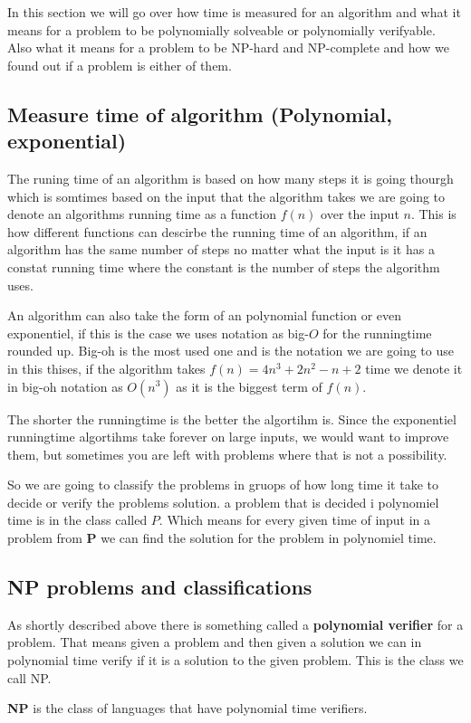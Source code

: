 In this section we will go over how time is measured for an algorithm and what it means for a problem to be polynomially solveable or polynomially verifyable. 
Also what it means for a problem to be NP-hard and NP-complete and how we found out if a problem is either of them. 

\subsection{Measure time of algorithm (Polynomial, exponential)}
The runing time of an algorithm is based on how many steps it is going thourgh which is somtimes based on the input that the algorithm takes we are going to denote an algorithms running time as a function $f(n)$ over the input $n$. 
This is how different functions can descirbe the running time of an algorithm, if an algorithm has the same number of steps no matter what the input is it has a constat running time where the constant is the number of steps the algorithm uses. 

An algorithm can also take the form of an polynomial function or even exponentiel, if this is the case we uses notation as big-$O$ for the runningtime rounded up. 
Big-oh is the most used one and is the notation we are going to use in this thises, if the algorithm takes $f(n)=4n^3 +2n^2-n+2$ time we denote it in big-oh notation as $O(n^3)$ as it is the biggest term of $f(n)$.  

The shorter the runningtime is the better the algortihm is.
Since the exponentiel runningtime algortihms take forever on large inputs, we would want to improve them, but sometimes you are left with problems where that is not a possibility.

So we are going to classify the problems in gruops of how long time it take to decide or verify the problems solution. a problem that is decided i polynomiel time is in the class called $P$.
Which means for every given time of input in a problem from \textbf{P} we can find the solution for the problem in polynomiel time.

\subsection{NP problems and classifications}
As shortly described above there is something called a \textbf{polynomial verifier} for a problem. 
That means given a problem and then given a solution we can in polynomial time verify if it is a solution to the given problem. This is the class we call NP.
\begin{definition}
    \textbf{NP} is the class of languages that have polynomial time verifiers.
\end{definition}

